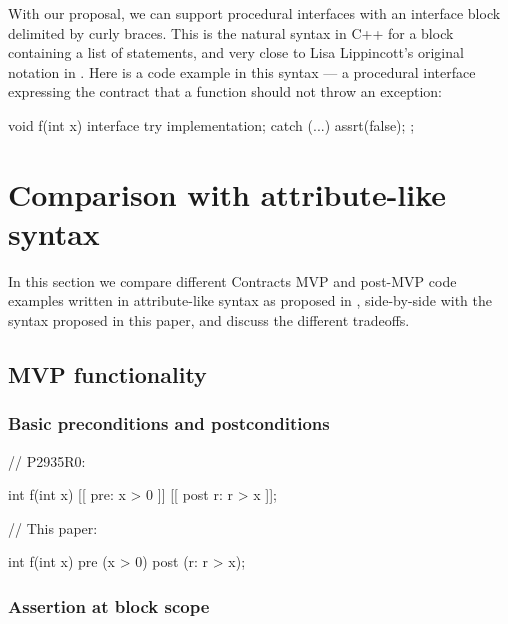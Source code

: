 With our proposal, we can support procedural interfaces with an interface block delimited by curly braces. This is the natural syntax in C++ for a block containing a list of statements, and very close to Lisa Lippincott's original notation in \cite{P0465R0}. Here is a code example in this syntax --- a procedural interface expressing the contract that a function should not throw an exception:

\vspace{2mm}
\begin{codeblock}
void f(int x)
interface {
  try {
    implementation;
  } 
  catch (...) {
    assrt(false);
  }
};
\end{codeblock}

\section{Comparison with attribute-like syntax}

In this section we compare different Contracts MVP and post-MVP code examples written in attribute-like syntax as proposed in \cite{P2935R0}, side-by-side with the syntax proposed in this paper, and discuss the different tradeoffs.

\subsection{MVP functionality}

\subsubsection{Basic preconditions and postconditions}

\begin{minipage}{8cm}
\begin{codeblock}
// P2935R0:

int f(int x) 
  [[ pre: x > 0 ]]
  [[ post r: r > x ]];
\end{codeblock}
\end{minipage}
\begin{minipage}{8cm}
\begin{codeblock}
// This paper:

int f(int x) 
  pre (x > 0)
  post (r: r > x);
\end{codeblock}
\end{minipage}

\subsubsection{Assertion at block scope}

